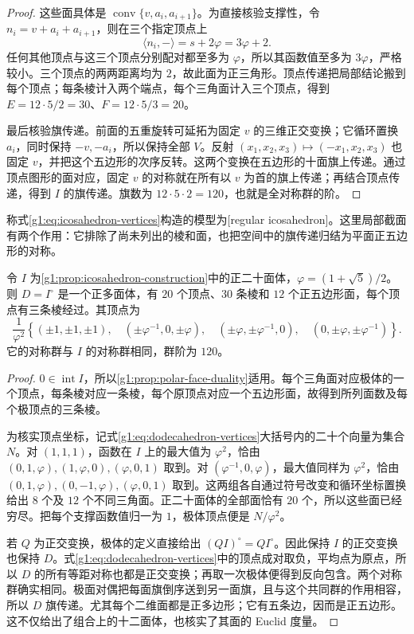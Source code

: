 \begin{proof}
	这些面具体是 \(\operatorname{conv}\{v,a_i,a_{i+1}\}\)。为直接核验支撑性，令 \(n_i=v+a_i+a_{i+1}\)，则在三个指定顶点上
	\[
		\langle n_i,-\rangle=s+2\varphi=3\varphi+2.
	\]
	任何其他顶点与这三个顶点分别配对都至多为 \(\varphi\)，所以其函数值至多为 \(3\varphi\)，严格较小。三个顶点的两两距离均为 \(2\)，故此面为正三角形。顶点传递把局部结论搬到每个顶点；每条棱计入两个端点，每个三角面计入三个顶点，得到 \(E=12\cdot5/2=30\)、\(F=12\cdot5/3=20\)。

	最后核验旗传递。前面的五重旋转可延拓为固定 \(v\) 的三维正交变换；它循环置换 \(a_i\)，同时保持 \(-v,-a_i\)，所以保持全部 \(V\)。反射 \((x_1,x_2,x_3)\mapsto(-x_1,x_2,x_3)\) 也固定 \(v\)，并把这个五边形的次序反转。这两个变换在五边形的十面旗上传递。通过顶点图形的面对应，固定 \(v\) 的对称就在所有以 \(v\) 为首的旗上传递；再结合顶点传递，得到 \(I\) 的旗传递。旗数为 \(12\cdot5\cdot2=120\)，也就是全对称群的阶。
\end{proof}

称式\eqref{g1:eq:icosahedron-vertices}构造的模型为[regular icosahedron]。这里局部截面有两个作用：它排除了尚未列出的棱和面，也把空间中的旗传递归结为平面正五边形的对称。

\begin{proposition}
	\label{g1:prop:dodecahedron-construction}
	令 \(I\) 为\cref{g1:prop:icosahedron-construction}中的正二十面体，\(\varphi=(1+\sqrt5)/2\)。则 \(D=I^\circ\) 是一个正多面体，有 \(20\) 个顶点、\(30\) 条棱和 \(12\) 个正五边形面，每个顶点有三条棱经过。其顶点为
	\begin{equation}
		\label{g1:eq:dodecahedron-vertices}
		\frac1{\varphi^2}\left\{
		(\pm1,\pm1,\pm1),\quad
		(\pm\varphi^{-1},0,\pm\varphi),\quad
		(\pm\varphi,\pm\varphi^{-1},0),\quad
		(0,\pm\varphi,\pm\varphi^{-1})\right\}.
	\end{equation}
	它的对称群与 \(I\) 的对称群相同，群阶为 \(120\)。
\end{proposition}
\begin{proof}
	\(0\in\operatorname{int}I\)，所以\cref{g1:prop:polar-face-duality}适用。每个三角面对应极体的一个顶点，每条棱对应一条棱，每个原顶点对应一个五边形面，故得到所列面数及每个极顶点的三条棱。

	为核实顶点坐标，记式\eqref{g1:eq:dodecahedron-vertices}大括号内的二十个向量为集合 \(N\)。对 \((1,1,1)\)，函数在 \(I\) 上的最大值为 \(\varphi^2\)，恰由 \((0,1,\varphi),(1,\varphi,0),(\varphi,0,1)\) 取到。对 \((\varphi^{-1},0,\varphi)\)，最大值同样为 \(\varphi^2\)，恰由 \((0,1,\varphi),(0,-1,\varphi),(\varphi,0,1)\) 取到。这两组各自通过符号改变和循环坐标置换给出 \(8\) 个及 \(12\) 个不同三角面。正二十面体的全部面恰有 \(20\) 个，所以这些面已经穷尽。把每个支撑函数值归一为 \(1\)，极体顶点便是 \(N/\varphi^2\)。

	若 \(Q\) 为正交变换，极体的定义直接给出 \((QI)^\circ=QI^\circ\)。因此保持 \(I\) 的正交变换也保持 \(D\)。式\eqref{g1:eq:dodecahedron-vertices}中的顶点成对取负，平均点为原点，所以 \(D\) 的所有等距对称也都是正交变换；再取一次极体便得到反向包含。两个对称群确实相同。极面对偶把每面旗倒序送到另一面旗，且与这个共同群的作用相容，所以 \(D\) 旗传递。尤其每个二维面都是正多边形；它有五条边，因而是正五边形。这不仅给出了组合上的十二面体，也核实了其面的 Euclid 度量。
\end{proof}

